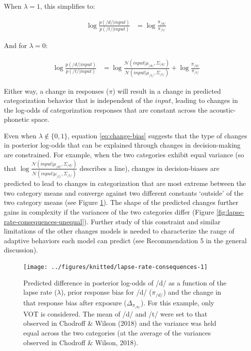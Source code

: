\documentclass[
  11pt,
  english,
  man,floatsintext]{apa6}
\begin{document}
When \(\lambda=1\), this simplifies to:

\begin{equation}
\begin{split}
\log \frac{p(/d/ | input)}{p(/t/ | input)} & = \log\frac{\pi_{/d/}}{\pi_{/t/}}
\end{split}
\end{equation}

And for \(\lambda=0\):

\begin{equation}
\begin{split}
\log \frac{p(/d/ | input)}{p(/t/ | input)} & = \log \frac{\mathcal{N}\!\left( input | \mu_{/d/}, \Sigma_{/d/} \right)}{\mathcal{N}\!\left( input | \mu_{/t/}, \Sigma_{/t/} \right)} + \log\frac{\pi_{/d/}}{\pi_{/t/}} 
\end{split}
\end{equation}

Either way, a change in responses (\(\pi\)) will result in a change in predicted categorization behavior that is independent of the \(input\), leading to changes in the log-odds of categorization responses that are constant across the acoustic-phonetic space.

Even when \(\lambda \not\in \{0,1\}\), equation \eqref{eq:change-bias} suggests that the type of changes in posterior log-odds that can be explained through changes in decision-making are constrained. For example, when the two categories exhibit equal variance (so that \(\log \frac{\mathcal{N}\!\left( input | \mu_{/d/}, \Sigma_{/d/} \right)}{\mathcal{N}\!\left( input | \mu_{/t/}, \Sigma_{/t/} \right)}\) describes a line), changes in decision-biases are predicted to lead to changes in categorization that are most extreme between the two category means and converge against two different constants `outside' of the two category means (see Figure \ref{fig:lapse-rate-consequences}). The shape of the predicted changes further gains in complexity if the variances of the two categories differ (Figure \ref{fig:lapse-rate-consequences-unequal}). Further study of this constraint and similar limitations of the other changes models is needed to characterize the range of adaptive behaviors each model can predict (see Recommendation 5 in the general discussion).



\begin{figure}

{\centering \texttt{[image: ../figures/knitted/lapse-rate-consequences-1]} 

}

\caption{Predicted difference in posterior log-odds of /d/ as a function of the lapse rate (\(\lambda\)), prior response bias for /d/ (\(\pi_{/d/}\)) and the change in that response bias after exposure (\(\Delta_{\pi_{/d/}}\)). For this example, only VOT is considered. The mean of /d/ and /t/ were set to that observed in Chodroff \& Wilson (2018) and the variance was held equal across the two categories (at the average of the variances observed in Chodroff \& Wilson, 2018).}\label{fig:lapse-rate-consequences}
\end{figure}
\end{document}
